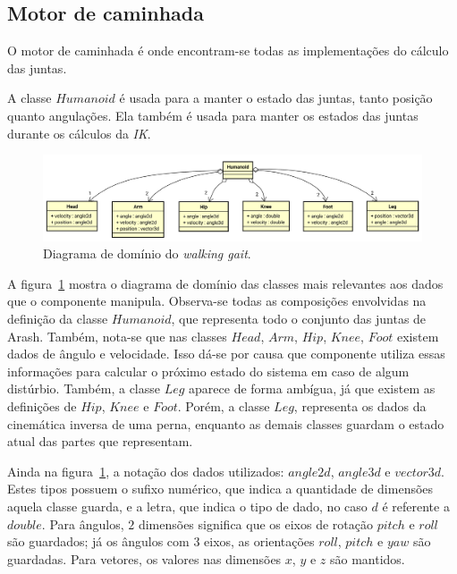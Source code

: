 \subsection{Motor de caminhada}

O motor de caminhada é onde encontram-se todas as implementações do cálculo das juntas.

A classe $Humanoid$ é usada para a manter o estado das juntas, tanto posição quanto angulações. Ela também é usada para manter os estados das juntas durante os cálculos da \textit{IK}.

\begin{figure}[htb]
	\centering
	\includegraphics[scale=0.4]{imagens/svg/walkinggait-domain}
	\caption{Diagrama de domínio do \textit{walking gait}.}
	\label{fig:architecture:walkinggait:domain}
\end{figure}

A figura~\ref{fig:architecture:walkinggait:domain} mostra o diagrama de domínio das classes mais relevantes aos dados que o componente manipula. Observa-se todas as composições envolvidas na definição da classe $Humanoid$, que representa todo o conjunto das juntas de Arash. Também, nota-se que nas classes $Head$, $Arm$, $Hip$, $Knee$, $Foot$ existem dados de ângulo e velocidade. Isso dá-se por causa que componente utiliza essas informações para calcular o próximo estado do sistema em caso de algum distúrbio. Também, a classe $Leg$ aparece de forma ambígua, já que existem as definições de $Hip$, $Knee$ e $Foot$. Porém, a classe $Leg$, representa os dados da cinemática inversa de uma perna, enquanto as demais classes guardam o estado atual das partes que representam.

Ainda na figura~\ref{fig:architecture:walkinggait:domain}, a notação dos dados utilizados: $angle2d$, $angle3d$ e $vector3d$. Estes tipos possuem o sufixo numérico, que indica a quantidade de dimensões aquela classe guarda, e a letra, que indica o tipo de dado, no caso $d$ é referente a $double$. Para ângulos, $2$ dimensões significa que os eixos de rotação $pitch$ e $roll$ são guardados; já os ângulos com $3$ eixos, as orientações $roll$, $pitch$ e $yaw$ são guardadas. Para vetores, os valores nas dimensões $x$, $y$ e $z$ são mantidos.

